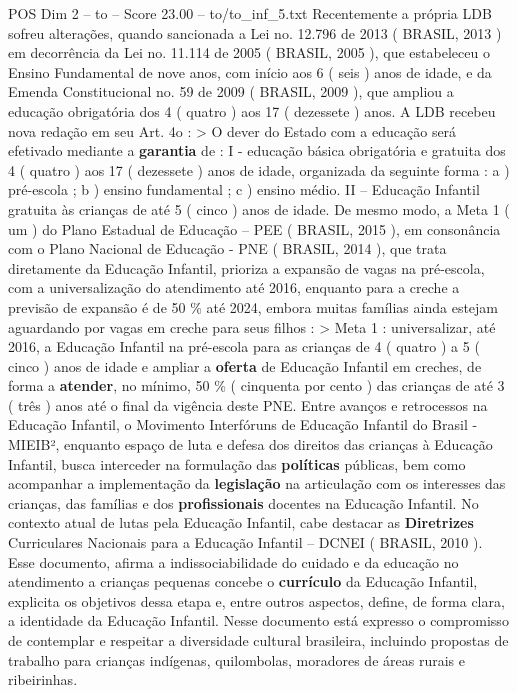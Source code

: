 \begin{textsample}{POS Dim 2 – to – Score 23.00 – to/to\_inf\_5.txt}
Recentemente a própria LDB sofreu alterações, quando sancionada a Lei no. 12.796 de 2013 ( BRASIL, 2013 ) em decorrência da Lei no. 11.114 de 2005 ( BRASIL, 2005 ), que estabeleceu o Ensino Fundamental de nove anos, com início aos 6 ( seis ) anos de idade, e da Emenda Constitucional no. 59 de 2009 ( BRASIL, 2009 ), que ampliou a educação obrigatória dos 4 ( quatro ) aos 17 ( dezessete ) anos.
A LDB recebeu nova redação em seu Art. 4o : > O dever do Estado com a educação será efetivado mediante a \textbf{garantia} de : I - educação básica obrigatória e gratuita dos 4 ( quatro ) aos 17 ( dezessete ) anos de idade, organizada da seguinte forma : a ) pré-escola ; b ) ensino fundamental ; c ) ensino médio.
II – Educação Infantil gratuita às crianças de até 5 ( cinco ) anos de idade.
De mesmo modo, a Meta 1 ( um ) do Plano Estadual de Educação – PEE ( BRASIL, 2015 ), em consonância com o Plano Nacional de Educação - PNE ( BRASIL, 2014 ), que trata diretamente da Educação Infantil, prioriza a expansão de vagas na pré-escola, com a universalização do atendimento até 2016, enquanto para a creche a previsão de expansão é de 50 \% até 2024, embora muitas famílias ainda estejam aguardando por vagas em creche para seus filhos : > Meta 1 : universalizar, até 2016, a Educação Infantil na pré-escola para as crianças de 4 ( quatro ) a 5 ( cinco ) anos de idade e ampliar a \textbf{oferta} de Educação Infantil em creches, de forma a \textbf{atender}, no mínimo, 50 \% ( cinquenta por cento ) das crianças de até 3 ( três ) anos até o final da vigência deste PNE.
Entre avanços e retrocessos na Educação Infantil, o Movimento Interfóruns de Educação Infantil do Brasil - MIEIB², enquanto espaço de luta e defesa dos direitos das crianças à Educação Infantil, busca interceder na formulação das \textbf{políticas} públicas, bem como acompanhar a implementação da \textbf{legislação} na articulação com os interesses das crianças, das famílias e dos \textbf{profissionais} docentes na Educação Infantil.
No contexto atual de lutas pela Educação Infantil, cabe destacar as \textbf{Diretrizes} Curriculares Nacionais para a Educação Infantil – DCNEI ( BRASIL, 2010 ).
Esse documento, afirma a indissociabilidade do cuidado e da educação no atendimento a crianças pequenas concebe o \textbf{currículo} da Educação Infantil, explicita os objetivos dessa etapa e, entre outros aspectos, define, de forma clara, a identidade da Educação Infantil.
Nesse documento está expresso o compromisso de contemplar e respeitar a diversidade cultural brasileira, incluindo propostas de trabalho para crianças indígenas, quilombolas, moradores de áreas rurais e ribeirinhas.

\end{textsample}
